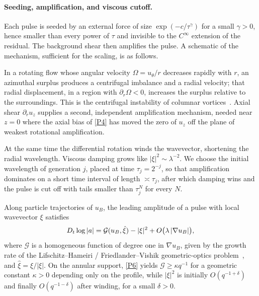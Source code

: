 \paragraph{Seeding, amplification, and viscous cutoff.}
Each pulse is seeded by an external force of size $\exp(-c/\tau^{\gamma})$ for a small $\gamma>0$, hence smaller than every power of $\tau$ and invisible to the $C^\infty$ extension of the residual. The background shear then amplifies the pulse. A schematic of the mechanism, sufficient for the scaling, is as follows.

In a rotating flow whose angular velocity $\Omega=u_\theta/r$ decreases rapidly with $r$, an azimuthal surplus produces a centrifugal imbalance and a radial velocity; that radial displacement, in a region with $\partial_r\Omega<0$, increases the surplus relative to the surroundings. This is the centrifugal instability of columnar vortices~\cite{leibovichstewartson1978}. Axial shear $\partial_r u_z$ supplies a second, independent amplification mechanism, needed near $z=0$ where the axial bias of \ref{P4} has moved the zero of $u_z$ off the plane of weakest rotational amplification.

At the same time the differential rotation winds the wavevector, shortening the radial wavelength. Viscous damping grows like $|\xi|^2\sim \lambda^{-2}$. We choose the initial wavelength of generation $j$, placed at time $\tau_j=2^{-j}$, so that amplification dominates on a short time interval of length $\asymp\tau_j$, after which damping wins and the pulse is cut off with tails smaller than $\tau_j^{N}$ for every $N$.

\begin{lemma}
\label{lem:wkb}
Along particle trajectories of $u_B$, the leading amplitude of a pulse with local wavevector $\xi$ satisfies
\begin{equation}
\label{eq:wkb}
D_t \log |a|
=\mathcal G(u_B,\hat\xi)
-|\xi|^2
+O\bigl(\lambda\,|\nabla u_B|\bigr),
\end{equation}
where $\mathcal G$ is a homogeneous function of degree one in $\nabla u_B$, given by the growth rate of the {L}ifschitz--{H}ameiri / {F}riedlander--{V}ishik geometric-optics problem~\cite{lifschitz1991,friedlandervishik1991}, and $\hat\xi=\xi/|\xi|$. On the annular support, \ref{P6} yields $\mathcal G\ge \kappa q^{-1}$ for a geometric constant $\kappa>0$ depending only on the profile, while $|\xi|^2$ is initially $O(q^{-1+\delta})$ and finally $O(q^{-1-\delta})$ after winding, for a small $\delta>0$.
\end{lemma}

